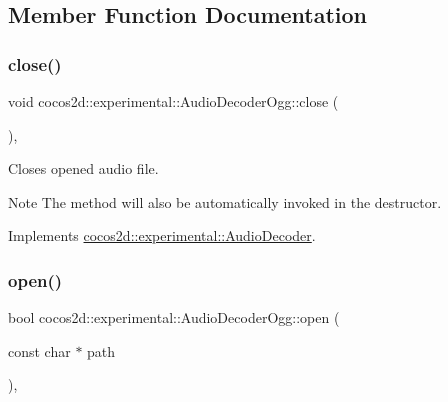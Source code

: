 \subsection{Member Function Documentation}
\mbox{\label{classcocos2d_1_1experimental_1_1AudioDecoderOgg_abca712fe6031eaebf98f6ac7eef64b0e}} 
\subsubsection{\texorpdfstring{close()}{close()}}
{\footnotesize\ttfamily void cocos2d\+::experimental\+::\+Audio\+Decoder\+Ogg\+::close (\begin{DoxyParamCaption}{ }\end{DoxyParamCaption})\hspace{0.3cm}{\ttfamily [override]}, {\ttfamily [virtual]}}



Closes opened audio file. 

\begin{DoxyNote}{Note}
The method will also be automatically invoked in the destructor. 
\end{DoxyNote}


Implements \hyperlink{classcocos2d_1_1experimental_1_1AudioDecoder_a89e94516cd7103d98475dc27462a58a7}{cocos2d\+::experimental\+::\+Audio\+Decoder}.

\mbox{\label{classcocos2d_1_1experimental_1_1AudioDecoderOgg_a7df966c2d88ddefe6fb4a49b8a1ceabb}} 
\subsubsection{\texorpdfstring{open()}{open()}}
{\footnotesize\ttfamily bool cocos2d\+::experimental\+::\+Audio\+Decoder\+Ogg\+::open (\begin{DoxyParamCaption}\item[{const char $\ast$}]{path }\end{DoxyParamCaption})\hspace{0.3cm}{\ttfamily [override]}, {\ttfamily [virtual]}}



